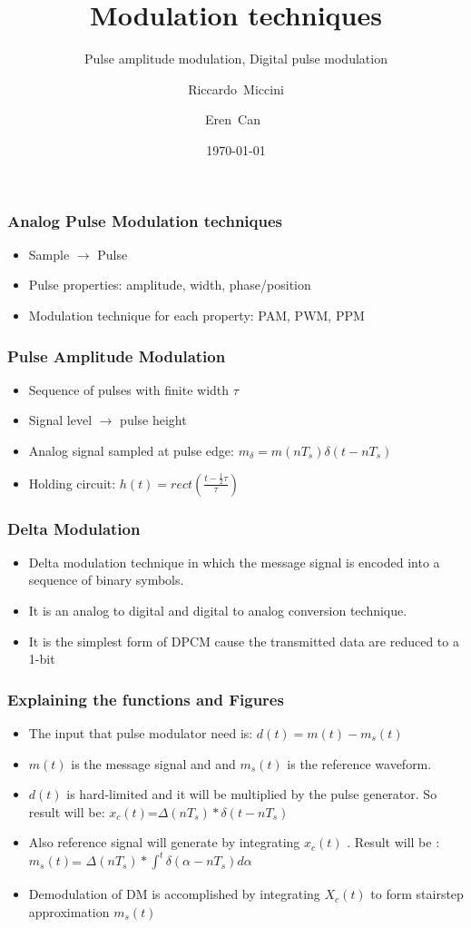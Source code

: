 \documentclass{beamer}
\title{Modulation techniques}
\subtitle{Pulse amplitude modulation, Digital pulse modulation}
\author[Riccardo \and Eren]{Riccardo~Miccini\inst{1} \and Eren~Can~\inst{1}}
\institute[DTU]
{
	\inst{1}
	Technical University of Denmark\\
	Digital Communication
}
\date{\today}
\begin{document}
	\frame{\titlepage}

	\begin{frame}
		\frametitle{Analog Pulse Modulation techniques}
		\begin{itemize}
			\item Sample $ \rightarrow $ Pulse
			\item Pulse properties: amplitude, width, phase/position
			\item Modulation technique for each property: PAM, PWM, PPM
		\end{itemize}
	\end{frame}

	\begin{frame}
		\frametitle{Pulse Amplitude Modulation}
		\begin{itemize}
			\item Sequence of pulses with finite width $ \tau $
			\item Signal level $ \rightarrow $ pulse height
			\item Analog signal sampled at pulse edge: $ m_\delta = m(nT_s)\delta(t - nT_s) $
			\item Holding circuit: $ h(t) = rect(\frac{t - \frac{1}{2}\tau}{\tau}) $
		\end{itemize}
	\end{frame}

	\begin{frame}
		\frametitle{Delta Modulation}
		\begin{itemize}
			\item Delta modulation technique in which the message signal is encoded into a sequence of binary symbols.
			\item It is an analog to digital and digital to analog conversion technique.
			\item  It is the simplest form of DPCM cause the transmitted data are reduced to  a 1-bit
		\end{itemize}
	\end{frame}
	
	\begin{frame}
	\frametitle{Explaining the functions and Figures}
	\begin{itemize}
	\item The input that pulse modulator need is: $ d(t)= m(t)-m_s(t) $
    	\item $m(t)$ is the message signal and and $m_s(t)$ is the reference waveform.
	\item $d(t)$ is  hard-limited and it will be multiplied by the pulse generator. So result will be: $x_c(t)$=$\Delta(nT_s)*\delta(t-nT_s)$
	\item Also reference signal will generate by integrating $ x_c(t)$ . Result will be : $m_s(t)$= $\Delta(nT_s)*\int_{}^{t}\delta(\alpha - nT_s)d\alpha $
	\item Demodulation of DM is accomplished by integrating $X_c(t)$ to form stairstep approximation $m_s(t)$
	\end{itemize}
         \end{frame}
         
\end{document}
